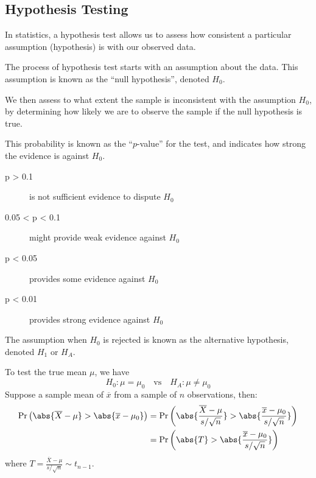 \documentclass{article}
\begin{document}
\subsection{Hypothesis Testing}
\begin{definition}
    In statistics, a hypothesis test allows us to assess how
    consistent a particular assumption (hypothesis) is with our
    observed data.

    The process of hypothesis test starts with an assumption about the
    data. This assumption is known as the ``null hypothesis'', denoted $H_0$.

    We then assess to what extent the sample is inconsistent with the assumption $H_0$,
    by determining how likely we are to observe the sample if the null hypothesis is true.

    This probability is known as the ``$p$-value'' for the test, and indicates how strong the
    evidence is against $H_0$.
    \begin{description}
        \item[p > 0.1] is not sufficient evidence to dispute $H_0$
        \item[0.05 < p < 0.1] might provide weak evidence against $H_0$
        \item[p < 0.05] provides some evidence against $H_0$
        \item[p < 0.01] provides strong evidence against $H_0$
    \end{description}
    The assumption when $H_0$ is rejected is known as the alternative hypothesis, denoted $H_1$ or $H_A$.

    To test the true mean $\mu$, we have
    \begin{equation*}
        H_0:\mu = \mu_0 \quad \text{vs} \quad H_A:\mu \neq \mu_0
    \end{equation*}
    Suppose a sample mean of $\overline{x}$ from a sample of $n$ observations, then:
    \begin{align*}
        \Pr{\left( \abs{\overline{X} - \mu} > \abs{\overline{x} - \mu_0} \right)} & = \Pr{\left( \abs{\frac{\overline{X} - \mu}{s/\sqrt{n}}} > \abs{\frac{\overline{x} - \mu_0}{s/\sqrt{n}}} \right)} \\
                                                                                  & = \Pr{\left( \abs{T} > \abs{\frac{\overline{x} - \mu_0}{s/\sqrt{n}}} \right)}
    \end{align*}
    where $T=\frac{\overline{X} - \mu}{s/\sqrt{n}}\sim t_{n-1}$.
\end{definition}
\end{document}

